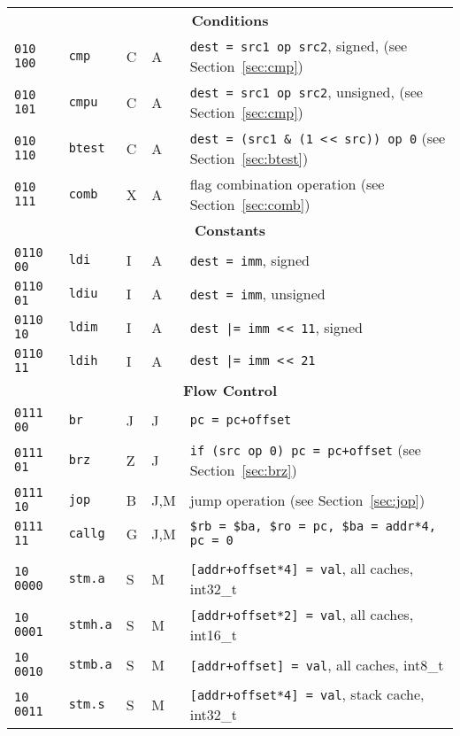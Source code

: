 \documentclass[10pt,DIV12]{scrartcl}
\newcommand{\shl}{\textless$\,\!$\textless}
\begin{document}
\begin{longtable}{llllp{}}
\midrule
\multicolumn{5}{c}{\textsf{\textbf{Conditions}}} \\
\cmidrule{1-5}
\texttt{010 100} & \texttt{cmp} & C & A & \texttt{dest = src1 op src2}, signed, (see Section~\ref{sec:cmp}) \\
\texttt{010 101} & \texttt{cmpu} & C & A & \texttt{dest = src1 op src2}, unsigned, (see Section~\ref{sec:cmp}) \\
\texttt{010 110} & \texttt{btest} & C & A & \texttt{dest = (src1 \& (1 \shl{} src)) op 0} (see Section~\ref{sec:btest}) \\
\texttt{010 111} & \texttt{comb} & X & A & flag combination operation (see Section~\ref{sec:comb}) \\
\midrule
\multicolumn{5}{c}{\textsf{\textbf{Constants}}} \\
\cmidrule{1-5}
\texttt{0110 00} & \texttt{ldi} & I & A & \texttt{dest = imm}, signed \\
\texttt{0110 01} & \texttt{ldiu} & I & A & \texttt{dest = imm}, unsigned \\
\texttt{0110 10} & \texttt{ldim} & I & A & \texttt{dest |= imm \shl{} 11}, signed \\
\texttt{0110 11} & \texttt{ldih} & I & A & \texttt{dest |= imm \shl{} 21} \\
\midrule
\multicolumn{5}{c}{\textsf{\textbf{Flow Control}}} \\
\cmidrule{1-5}
\texttt{0111 00} & \texttt{br} & J & J & \texttt{pc = pc+offset} \\
\texttt{0111 01} & \texttt{brz} & Z & J & \texttt{if (src op 0) pc = pc+offset} (see Section~\ref{sec:brz}) \\
\texttt{0111 10} & \texttt{jop} & B & J,M & jump operation (see Section~\ref{sec:jop}) \\
\texttt{0111 11} & \texttt{callg} & G & J,M & \texttt{\$rb = \$ba, \$ro = pc, \$ba = addr*4, pc = 0} \\
\midrule
\pagebreak
\midrule
\multicolumn{5}{c}{\textsf{\textbf{Memory Accesses}}} \\
\cmidrule{1-5}
\texttt{10 0000} & \texttt{stm.a} & S & M & \texttt{[addr+offset*4] = val}, all caches, int32\_t \\
\texttt{10 0001} & \texttt{stmh.a} & S & M & \texttt{[addr+offset*2] = val}, all caches, int16\_t \\
\texttt{10 0010} & \texttt{stmb.a} & S & M & \texttt{[addr+offset] = val}, all caches, int8\_t \\
\texttt{10 0011} & \texttt{stm.s} & S & M & \texttt{[addr+offset*4] = val}, stack cache, int32\_t \\

\end{longtable}
\end{document}
